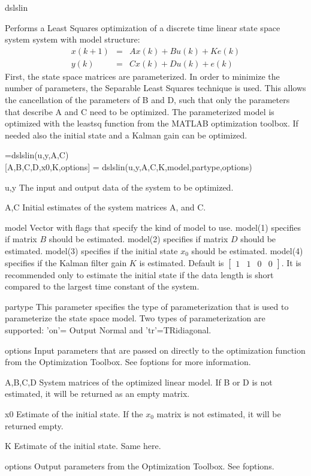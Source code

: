 \documentclass{book}
\newcommand{\mat}[2]{\left[\begin{array}{#1}#2\end{array}\right]}
\begin{document}
\begin{command}{dslslin}
  \begin{purpose}
    Performs a Least Squares optimization of a discrete time linear
    state space system system with model structure:    
    \begin{eqnarray*}
      x(k+1) & = &  A x(k) + B u(k)+ Ke(k)\\
      y(k) & = & C x(k) + D u(k)+ e(k)
    \end{eqnarray*}
    First, the state space matrices are parameterized.  In order to
    minimize the number of parameters, the Separable Least Squares
    technique is used. This allows the cancellation of the parameters
    of B and D, such that only the parameters that describe A and C
    need to be optimized. The parameterized model is optimized with
    the leastsq function from the MATLAB optimization toolbox. If
    needed also the initial state and a Kalman gain can be optimized.
  \end{purpose}   
  \begin{syntax}
    [A,B,C,D]=dslslin(u,y,A,C)\\[0pt]
    [A,B,C,D,x0,K,options] = dslslin(u,y,A,C,K,model,partype,options)
  \end{syntax}
  \begin{inputs}
  \item[u,y] The input and output data of the system to be optimized.
  \item[A,C] Initial estimates of the system matrices A, and C.
  \item[model] Vector with flags that specify the kind of model to use.
    model(1) specifies if matrix $B$ should be estimated.
    model(2) specifies if matrix $D$ should be estimated.
    model(3) specifies if the initial state $x_0$ should be estimated.
    model(4) specifies if the Kalman filter gain $K$ is estimated.
    Default is $\mat{cccc}{1&1&0&0}$. It is recommended only to 
    estimate the initial state if the data length is 
    short compared to the largest time constant of the system.
  \item[partype] This parameter specifies the type of parameterization 
    that is used to parameterize the state space model.
    Two types of parameterization are supported:
    'on'= Output Normal and 'tr'=TRidiagonal.
  \item[options] Input parameters that are passed on directly to the
    optimization function from the Optimization Toolbox.
    See foptions for more information.
  \end{inputs}
  \begin{outputs}
  \item[A,B,C,D] System matrices of the optimized linear model.
    If B or D is not estimated, it will be returned as an empty matrix.
  \item[x0] Estimate of the initial state.
    If the $x_0$ matrix is not estimated, it will be returned empty.
  \item[K] Estimate of the initial state. Same here.
  \item[options] Output parameters from the Optimization Toolbox.  See
    foptions.
  \end{outputs}
  

\end{command}
\end{document}
